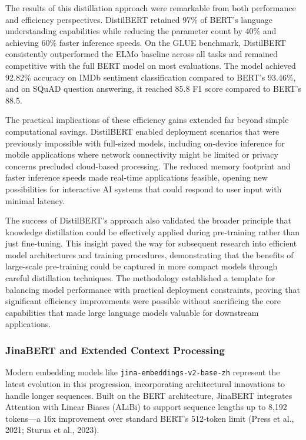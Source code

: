 \documentclass[
  titlepage]{article}
\begin{document}
The results of this distillation approach were remarkable from both
performance and efficiency perspectives. DistilBERT retained 97\% of
BERT's language understanding capabilities while reducing the parameter
count by 40\% and achieving 60\% faster inference speeds. On the GLUE
benchmark, DistilBERT consistently outperformed the ELMo baseline across
all tasks and remained competitive with the full BERT model on most
evaluations. The model achieved 92.82\% accuracy on IMDb sentiment
classification compared to BERT's 93.46\%, and on SQuAD question
answering, it reached 85.8 F1 score compared to BERT's 88.5.

The practical implications of these efficiency gains extended far beyond
simple computational savings. DistilBERT enabled deployment scenarios
that were previously impossible with full-sized models, including
on-device inference for mobile applications where network connectivity
might be limited or privacy concerns precluded cloud-based processing.
The reduced memory footprint and faster inference speeds made real-time
applications feasible, opening new possibilities for interactive AI
systems that could respond to user input with minimal latency.

The success of DistilBERT's approach also validated the broader
principle that knowledge distillation could be effectively applied
during pre-training rather than just fine-tuning. This insight paved the
way for subsequent research into efficient model architectures and
training procedures, demonstrating that the benefits of large-scale
pre-training could be captured in more compact models through careful
distillation techniques. The methodology established a template for
balancing model performance with practical deployment constraints,
proving that significant efficiency improvements were possible without
sacrificing the core capabilities that made large language models
valuable for downstream applications.

\subsubsection{JinaBERT and Extended Context
Processing}\label{jinabert-and-extended-context-processing}

Modern embedding models like \texttt{jina-embeddings-v2-base-zh}
represent the latest evolution in this progression, incorporating
architectural innovations to handle longer sequences. Built on the BERT
architecture, JinaBERT integrates Attention with Linear Biases (ALiBi)
to support sequence lengths up to 8,192 tokens---a 16x improvement over
standard BERT's 512-token limit (Press et al., 2021; Sturua et al.,
2023).
\end{document}
